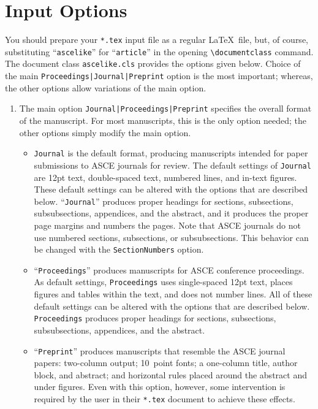 \documentclass[Proceedings]{ascelike}
\begin{document}
\section{Input Options}\label{sec:Input}
You should
prepare your \verb+*.tex+ input file as a regular
\LaTeX\ file,
but, of course, substituting ``\texttt{ascelike}'' for ``\texttt{article}''
in the opening \verb+\documentclass+ command.
The document class \texttt{ascelike.cls} provides the options given
below.
Choice of the main \verb+Proceedings|+\-\verb+Journal|+\-\verb+Preprint+ 
option is the most important; whereas,
the other options allow variations of the main option.
%
\begin{enumerate}
\item
The main option
\verb+Journal|+\verb+Proceedings|+\verb+Preprint+ specifies the overall 
format of the manuscript.
For most manuscripts, this is the only option needed;
the other options simply modify the main option.
%
\begin{itemize}
\item
\texttt{Journal} is the default format, 
producing manuscripts intended
for paper submissions to ASCE journals for review.
The default settings of \texttt{Journal}
are 12pt text, double-spaced text, numbered lines, and in-text figures.
These default settings can be altered with the options that are 
described below.
%
``\texttt{Journal}'' produces 
proper headings for
sections, subsections, subsubsections, appendices, and the abstract,
and it produces the proper page margins and numbers the pages.
Note that ASCE journals do not use numbered sections, subsections,
or subsubsections.
This behavior can be changed with the \texttt{SectionNumbers} option.
%
\item
``\texttt{Proceedings}'' produces
manuscripts for ASCE conference proceedings.  
As default settings, 
\verb+Proceedings+ uses single-spaced 12pt text,
places figures and tables within the text, and does not number lines.  
All of these default settings can be altered with the options that are
described below.
\texttt{Proceedings} produces proper headings for
sections, subsections, subsubsections, appendices, and the abstract.
%
\item
``\texttt{Preprint}'' produces
manuscripts that resemble the ASCE journal papers:
two-column output; 10~point fonts;
a one-column title, author block, and abstract;
and horizontal rules placed around the abstract and under figures.
Even with this option, however, some intervention is required 
by the user in their
\texttt{*.tex} document to achieve these effects.

\end{itemize}
\end{enumerate}
\end{document}
